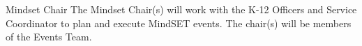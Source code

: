 \begin{enumsubsection}
\item{Mindset Chair} The Mindset Chair(s) will work with the K-12 Officers and Service Coordinator to plan and execute MindSET events.  The chair(s) will be members of the Events Team.








\end{enumsubsection}

